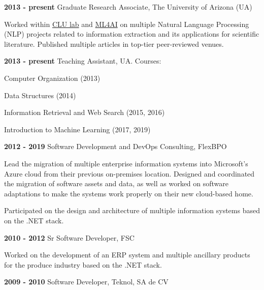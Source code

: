 \documentclass[letterpaper]{article}
\renewenvironment{itemize}{
  \begin{list}{}{
    \setlength{\leftmargin}{1.5em}
  }
}{
  \end{list}
}
\begin{document}
\begin{itemize}
\item \textbf{2013 - present} Graduate Research Associate, The University of Arizona (UA)
\item \begin{itemize}
	\item Worked within \href{http://clulab.cs.arizona.edu}{CLU lab} and \href{https://ml4ai.github.io}{ML4AI} on multiple Natural Language Processing (NLP) projects related to information extraction and its applications for scientific literature. Published multiple articles in top-tier peer-reviewed venues.
\end{itemize}
\item \textbf{2013 - present} Teaching Assistant, UA. Courses:
\item \begin{itemize}
	\item Computer Organization (2013)
	\item Data Structures (2014)
	\item Information Retrieval and Web Search (2015, 2016)
	\item Introduction to Machine Learning (2017, 2019)
\end{itemize}
\item \textbf{2012 - 2019} Software Development and DevOps Consulting, FlexBPO
\item \begin{itemize}
	\item Lead the migration of multiple enterprise information systems into Microsoft's Azure cloud from their previous on-premises location. Designed and coordinated the migration of software assets and data, as well as worked on software adaptations to make the systems work properly on their new cloud-based home.
	\item Participated on the design and architecture of multiple information systems based on the .NET stack.
\end{itemize}
\item \textbf{2010 - 2012} Sr Software Developer, FSC
\item \begin{itemize}
\item Worked on the development of an ERP system and multiple ancillary products for the produce industry based on the .NET stack.
\end{itemize}
\item \textbf{2009 - 2010} Software Developer, Teknol, SA de CV
\item \begin{itemize}

\end{itemize}
\end{itemize}
\end{document}
